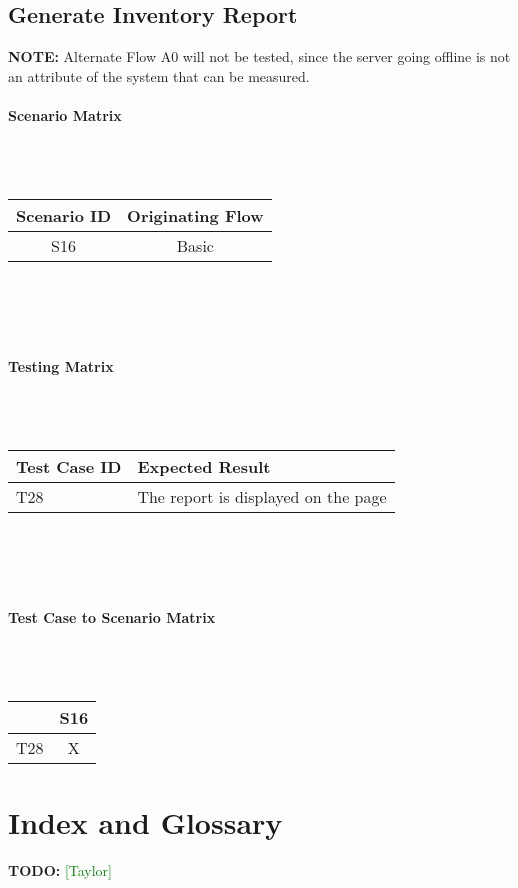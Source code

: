 \documentclass{article}
\newcommand{\taylor}{\textcolor{green}{[Taylor]}}
\begin{document}
\subsection{Generate Inventory Report}
\textbf{NOTE:} Alternate Flow A0 will not be tested, since the server going offline is not an attribute of the system that can be measured.

\paragraph{Scenario Matrix}~\\ \\
\begin{tabular}{ c  c }
\hline
Scenario ID & Originating Flow \\
\hline
\hline
S16 & Basic \\
\hline
\end{tabular}\\
~\\
~\\
\paragraph{Testing Matrix}~\\ \\
\begin{tabular}{ p{0.8in}  p{2.2in} }
\hline
Test Case ID & Expected Result\\
\hline
\hline
T28 & The report is displayed on the page\\
\hline
\end{tabular}\\
~\\
~\\
\paragraph{Test Case to Scenario Matrix}~\\ \\
\begin{tabular}{ | c || c | }
\hline
    & S16  \\
\hline
\hline
T28 &  X  \\
\hline

\end{tabular}
\section{Index and Glossary}
\textbf{TODO:} \taylor
\end{document}
